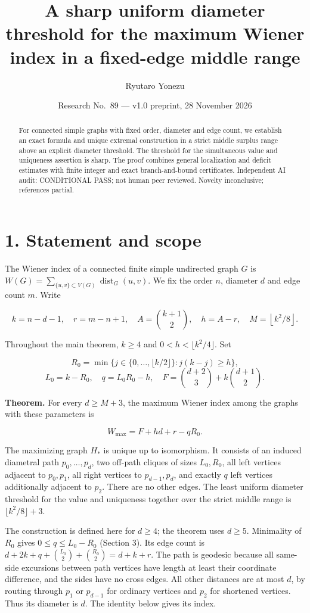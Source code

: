 \documentclass[
  11pt,
]{article}
\title{A sharp uniform diameter threshold for the maximum Wiener index
in a fixed-edge middle range}
\author{Ryutaro Yonezu}
\date{Research No.~89 --- v1.0 preprint, 28 November 2026}
\begin{document}
\maketitle
\begin{abstract}
For connected simple graphs with fixed order, diameter and edge count,
we establish an exact formula and unique extremal construction in a
strict middle surplus range above an explicit diameter threshold. The
threshold for the simultaneous value and uniqueness assertion is sharp.
The proof combines general localization and deficit estimates with
finite integer and exact branch-and-bound certificates. Independent AI
audit: CONDITIONAL PASS; not human peer reviewed. Novelty inconclusive;
references partial.
\end{abstract}

\section{1. Statement and scope}\label{statement-and-scope}

The Wiener index of a connected finite simple undirected graph \(G\) is
\(W(G)=\sum_{\{u,v\}\subset V(G)}\operatorname{dist}_G(u,v)\). We fix
the order \(n\), diameter \(d\) and edge count \(m\). Write

\[k=n-d-1,\quad r=m-n+1,\quad A=\binom{k+1}{2},\quad h=A-r,\quad M=\left\lfloor k^2/8\right\rfloor.\]

Throughout the main theorem, \(k\ge4\) and \(0<h<\lfloor k^2/4\rfloor\).
Set

\[R_0=\min\{j\in\{0,\ldots,\lfloor k/2\rfloor\}:j(k-j)\ge h\},\]
\[L_0=k-R_0,\quad q=L_0R_0-h,\quad F=\binom{d+2}{3}+k\binom{d+1}{2}.\]

\textbf{Theorem.} For every \(d\ge M+3\), the maximum Wiener index among
the graphs with these parameters is

\[\boxed{W_{\max}=F+hd+r-qR_0.}\]

The maximizing graph \(H_*\) is unique up to isomorphism. It consists of
an induced diametral path \(p_0,\ldots,p_d\), two off-path cliques of
sizes \(L_0,R_0\), all left vertices adjacent to \(p_0,p_1\), all right
vertices to \(p_{d-1},p_d\), and exactly \(q\) left vertices
additionally adjacent to \(p_2\). There are no other edges. The least
uniform diameter threshold for the value and uniqueness together over
the strict middle range is \(\lfloor k^2/8\rfloor+3\).

The construction is defined here for \(d\ge4\); the theorem uses
\(d\ge5\). Minimality of \(R_0\) gives \(0\le q\le L_0-R_0\) (Section
3). Its edge count is \(d+2k+q+\binom{L_0}{2}+\binom{R_0}{2}=d+k+r\).
The path is geodesic because all same-side excursions between path
vertices have length at least their coordinate difference, and the sides
have no cross edges. All other distances are at most \(d\), by routing
through \(p_1\) or \(p_{d-1}\) for ordinary vertices and \(p_2\) for
shortened vertices. Thus its diameter is \(d\). The identity below gives
its index.
\end{document}
